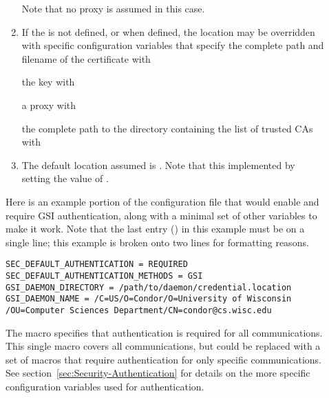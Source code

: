 \begin{description}
\begin{enumerate}
\normalsize
Note that no proxy is assumed in this case.
\item
If the  is not defined, 
or when defined,
the location may be overridden with specific configuration
variables that specify the complete path and filename of 
the certificate with
the key with
a proxy with
the complete path to the directory containing the list of trusted CAs with 
\item
The default location assumed is .
Note that this implemented by setting the value of  
.
\end{enumerate}

Here is an example portion of the configuration file that would
enable and require GSI authentication,
along with a minimal set of other variables to make it work. 
Note that the last entry () in this example
must be on a single line;
this example is broken onto two lines for formatting reasons.

\footnotesize
\begin{verbatim}
SEC_DEFAULT_AUTHENTICATION = REQUIRED
SEC_DEFAULT_AUTHENTICATION_METHODS = GSI
GSI_DAEMON_DIRECTORY = /path/to/daemon/credential.location
GSI_DAEMON_NAME = /C=US/O=Condor/O=University of Wisconsin
/OU=Computer Sciences Department/CN=condor@cs.wisc.edu
\end{verbatim}
\normalsize

The
 macro specifies that
authentication is required for all communications.
This single macro covers all communications, but could be
replaced with a set of macros that require authentication for
only specific communications.
See section~\ref{sec:Security-Authentication} for details on the
more specific configuration variables used for authentication.


\end{description}
